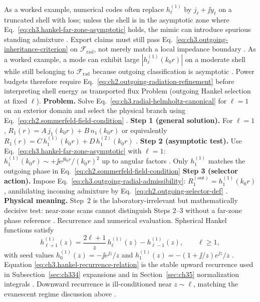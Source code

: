 As a worked example, numerical codes often replace \(h_{\ell}^{(1)}\) by \(j_{\ell}+\jj y_{\ell}\) on a truncated shell with loss;
unless the shell is in the asymptotic zone where Eq.~\eqref{eq:ch3.hankel-far-zone-asymptotic} holds, the mimic
can introduce spurious standing admixture . Export claims must still pass
Eq.~\eqref{eq:ch3.outgoing-inheritance-criterion} on \(\mathcal{F}_{\mathrm{rad}}\), not merely match a local
impedance boundary .
As a worked example, a mode can exhibit large \(|h_{\ell}^{(1)}(k_{0}r)|\) on a moderate shell while still belonging to
\(\mathcal{F}_{\mathrm{rad}}\) because outgoing classification is asymptotic
. Power budgets therefore require
Eq.~\eqref{eq:ch2.outgoing-radiation-refinement} before interpreting shell energy as transported flux
Problem (outgoing Hankel selection at fixed \(\ell\)). \textbf{Problem.} Solve Eq.~\eqref{eq:ch3.radial-helmholtz-canonical} for \(\ell=1\) on an exterior domain and
select the physical branch using Eq.~\eqref{eq:ch2.sommerfeld-field-condition} .
\textbf{Step 1 (general solution).} For \(\ell=1\),
\(R_{1}(r)=A\,j_{1}(k_{0}r)+B\,n_{1}(k_{0}r)\) or equivalently
\(R_{1}(r)=C\,h_{1}^{(1)}(k_{0}r)+D\,h_{1}^{(2)}(k_{0}r)\) .
\textbf{Step 2 (asymptotic test).} Use Eq.~\eqref{eq:ch3.hankel-far-zone-asymptotic} with \(\ell=1\):
\(h_{1}^{(1)}(k_{0}r)\sim +\jj e^{\jj k_{0}r}/(k_{0}r)^{2}\) up to angular factors . Only
\(h_{1}^{(1)}\) matches the outgoing phase in Eq.~\eqref{eq:ch2.sommerfeld-field-condition}
\textbf{Step 3 (selector action).} Impose Eq.~\eqref{eq:ch3.outgoing-radial-admissibility}:
\(R_{1}^{\mathrm{(out)}}=h_{1}^{(1)}(k_{0}r)\), annihilating incoming admixture by
Eq.~\eqref{eq:ch2.outgoing-selector-def} .
\textbf{Physical meaning.} Step~2 is the laboratory-irrelevant but mathematically decisive test: near-zone scans
cannot distinguish Steps 2--3 without a far-zone phase reference .
Recurrence and numerical evaluation. Spherical Hankel functions satisfy
\begin{equation}
\label{eq:ch3.hankel-recurrence-relation}
h_{\ell+1}^{(1)}(z)
=
\frac{2\ell+1}{z}\,h_{\ell}^{(1)}(z)
-h_{\ell-1}^{(1)}(z),
\qquad
\ell\ge1,
\end{equation}
with seed values \(h_{0}^{(1)}(z)=-\jj e^{\jj z}/z\) and
\(h_{1}^{(1)}(z)=-(1+\jj/z)e^{\jj z}/z\) . Equation
\eqref{eq:ch3.hankel-recurrence-relation} is the stable upward recurrence used in Subsection~\ref{sec:ch334}
expansions and in Section~\ref{sec:ch35} normalization integrals . Downward recurrence is
ill-conditioned near \(z\sim\ell\), matching the evanescent regime discussion above .
